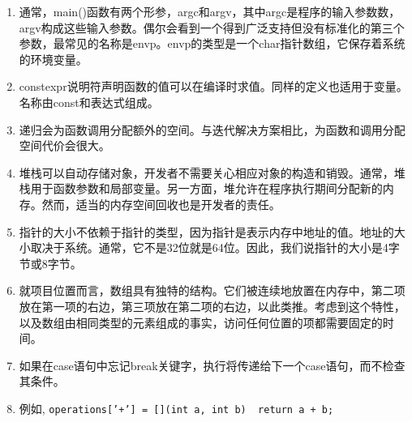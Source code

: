 \begin{enumerate}
	\item 通常，main()函数有两个形参，argc和argv，其中argc是程序的输入参数数，argv构成这些输入参数。偶尔会看到一个得到广泛支持但没有标准化的第三个参数，最常见的名称是envp。envp的类型是一个char指针数组，它保存着系统的环境变量。
	\item constexpr说明符声明函数的值可以在编译时求值。同样的定义也适用于变量。名称由const和表达式组成。
	\item 递归会为函数调用分配额外的空间。与迭代解决方案相比，为函数和调用分配空间代价会很大。
	\item 堆栈可以自动存储对象，开发者不需要关心相应对象的构造和销毁。通常，堆栈用于函数参数和局部变量。另一方面，堆允许在程序执行期间分配新的内存。然而，适当的内存空间回收也是开发者的责任。
	\item 指针的大小不依赖于指针的类型，因为指针是表示内存中地址的值。地址的大小取决于系统。通常，它不是32位就是64位。因此，我们说指针的大小是4字节或8字节。
	\item 就项目位置而言，数组具有独特的结构。它们被连续地放置在内存中，第二项放在第一项的右边，第三项放在第二项的右边，以此类推。考虑到这个特性，以及数组由相同类型的元素组成的事实，访问任何位置的项都需要固定的时间。
	\item 如果在case语句中忘记break关键字，执行将传递给下一个case语句，而不检查其条件。
	\item 例如,  \texttt{operations['+'] = [](int a, int b) { return a + b; } }
\end{enumerate}












